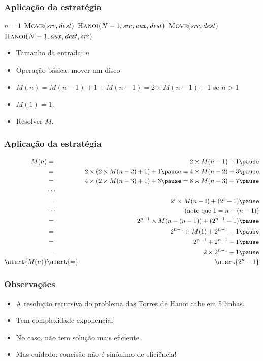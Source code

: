 \documentclass[handout]{beamer}
\begin{document}
\begin{frame}
\frametitle{Aplicação da estratégia}

\begin{small}
\begin{codebox}
\li \If $n = 1$
\li \Then
\li \Return $\proc{Move}(\id{src}, \id{dest})$
\li \Else
\li   $\proc{Hanoi}(N-1, \id{src}, \id{aux}, \id{dest})$
\li   $\proc{Move}(\id{src}, \id{dest})$
\li   $\proc{Hanoi}(N-1, \id{aux}, \id{dest}, \id{src})$
    \End
\end{codebox}
\end{small}
\begin{itemize}
\item Tamanho da entrada: $n$
\item Operação básica: mover um disco
\item $M(n) = M(n-1) + 1 + M(n-1) = 2 \times M(n-1) + 1$ se $n > 1$
\item $M(1) = 1$.
\item Resolver $M$.
\end{itemize}
\end{frame}

\begin{frame}
\frametitle{Aplicação da estratégia}

\begin{eqnarray*}
M(n) & = & 2 \times M(n-1) + 1 \pause \\
     & = & 2 \times (2 \times M(n-2) + 1) + 1 \pause = 4 \times M(n-2) + 3 \pause \\
     & = & 4 \times (2 \times M(n-3) + 1) + 3 \pause = 8 \times M(n-3) + 7 \pause \\
     & \cdots & \\
     & = & 2^i \times M(n-i) + (2^i - 1) \pause \\
     & \cdots & \mbox{(note que $1 = n - (n - 1)$)}\\
     & = & 2^{n-1} \times M(n-(n-1)) + (2^{n-1} - 1) \pause \\
     & = & 2^{n-1} \times M(1) + 2^{n-1} - 1 \pause \\
     & = & 2^{n-1} + 2^{n-1} - 1 \pause \\
     & = & 2 \times 2^{n-1} - 1 \pause \\
\alert{M(n)} & \alert{=} & \alert{2^n - 1}
\end{eqnarray*}

\end{frame}

\begin{frame}
\frametitle{Observações}
\begin{itemize}
\item A resolução recursiva do problema das Torres de Hanoi cabe em 5 linhas.
\item Tem complexidade exponencial
\item No caso, não tem solução mais eficiente.
\item Mas cuidado: concisão não é sinônimo de eficiência!
\end{itemize}
\end{frame}
\end{document}
